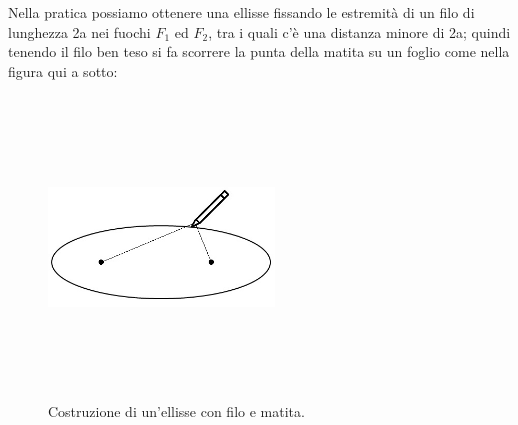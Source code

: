 Nella pratica possiamo ottenere una ellisse fissando le estremità di 
un filo di lunghezza 2a nei fuochi \( F_{1} \) ed \( F_{2} \), tra i quali c'è 
una distanza minore di 2a; quindi tenendo il filo ben teso si fa scorrere 
la punta della matita su un foglio come nella figura qui a sotto:
\begin{figure}[h]
  \centering%
  \includegraphics[height=8cm, width=6cm, keepaspectratio] {img/matita.jpg}%
  \caption{Costruzione di un'ellisse con filo e matita.}%
\end{figure}


